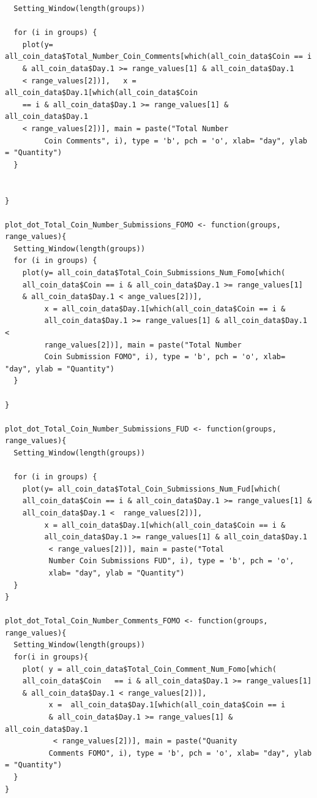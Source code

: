 \documentclass[12pt]{article}
\begin{document}
{\begin{verbatim}
  Setting_Window(length(groups))
  
  for (i in groups) {
    plot(y= all_coin_data$Total_Number_Coin_Comments[which(all_coin_data$Coin == i 
    & all_coin_data$Day.1 >= range_values[1] & all_coin_data$Day.1 
    < range_values[2])],   x = all_coin_data$Day.1[which(all_coin_data$Coin 
    == i & all_coin_data$Day.1 >= range_values[1] & all_coin_data$Day.1 
    < range_values[2])], main = paste("Total Number 
         Coin Comments", i), type = 'b', pch = 'o', xlab= "day", ylab = "Quantity")
  }
  
  
}

plot_dot_Total_Coin_Number_Submissions_FOMO <- function(groups, range_values){
  Setting_Window(length(groups))
  for (i in groups) {
    plot(y= all_coin_data$Total_Coin_Submissions_Num_Fomo[which(
    all_coin_data$Coin == i & all_coin_data$Day.1 >= range_values[1] 
    & all_coin_data$Day.1 < ange_values[2])], 
         x = all_coin_data$Day.1[which(all_coin_data$Coin == i & 
         all_coin_data$Day.1 >= range_values[1] & all_coin_data$Day.1 < 
         range_values[2])], main = paste("Total Number 
         Coin Submission FOMO", i), type = 'b', pch = 'o', xlab= "day", ylab = "Quantity")
  }
  
}

plot_dot_Total_Coin_Number_Submissions_FUD <- function(groups, range_values){
  Setting_Window(length(groups))
  
  for (i in groups) {
    plot(y= all_coin_data$Total_Coin_Submissions_Num_Fud[which(
    all_coin_data$Coin == i & all_coin_data$Day.1 >= range_values[1] & 
    all_coin_data$Day.1 <  range_values[2])], 
         x = all_coin_data$Day.1[which(all_coin_data$Coin == i & 
         all_coin_data$Day.1 >= range_values[1] & all_coin_data$Day.1
          < range_values[2])], main = paste("Total
          Number Coin Submissions FUD", i), type = 'b', pch = 'o', 
          xlab= "day", ylab = "Quantity")
  }
}

plot_dot_Total_Coin_Number_Comments_FOMO <- function(groups, range_values){
  Setting_Window(length(groups))
  for(i in groups){
    plot( y = all_coin_data$Total_Coin_Comment_Num_Fomo[which(
    all_coin_data$Coin   == i & all_coin_data$Day.1 >= range_values[1] 
    & all_coin_data$Day.1 < range_values[2])],
          x =  all_coin_data$Day.1[which(all_coin_data$Coin == i 
          & all_coin_data$Day.1 >= range_values[1] & all_coin_data$Day.1
           < range_values[2])], main = paste("Quanity 
          Comments FOMO", i), type = 'b', pch = 'o', xlab= "day", ylab = "Quantity")
  }
}


\end{verbatim}}
\end{document}
